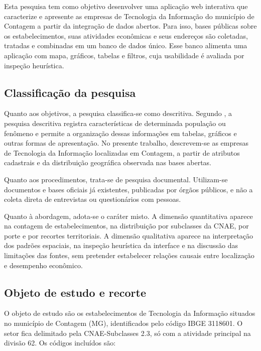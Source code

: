 Esta pesquisa tem como objetivo desenvolver uma aplicação web interativa que caracterize e apresente as empresas de Tecnologia da Informação do município de Contagem a partir da integração de dados abertos.
Para isso, bases públicas sobre os estabelecimentos, suas atividades econômicas e seus endereços são coletadas, tratadas e combinadas em um banco de dados único.
Esse banco alimenta uma aplicação com mapa, gráficos, tabelas e filtros, cuja usabilidade é avaliada por inspeção heurística.

\subsection{Classificação da pesquisa}

Quanto aos objetivos, a pesquisa classifica-se como descritiva.
Segundo , a pesquisa descritiva registra características de determinada população ou fenômeno e permite a organização dessas informações em tabelas, gráficos e outras formas de apresentação.
No presente trabalho, descrevem-se as empresas de Tecnologia da Informação localizadas em Contagem, a partir de atributos cadastrais e da distribuição geográfica observada nas bases abertas.

Quanto aos procedimentos, trata-se de pesquisa documental.
Utilizam-se documentos e bases oficiais já existentes, publicadas por órgãos públicos, e não a coleta direta de entrevistas ou questionários com pessoas.

Quanto à abordagem, adota-se o caráter misto.
A dimensão quantitativa aparece na contagem de estabelecimentos, na distribuição por subclasses da CNAE, por porte e por recortes territoriais.
A dimensão qualitativa aparece na interpretação dos padrões espaciais, na inspeção heurística da interface e na discussão das limitações das fontes, sem pretender estabelecer relações causais entre localização e desempenho econômico.

\subsection{Objeto de estudo e recorte}

O objeto de estudo são os estabelecimentos de Tecnologia da Informação situados no município de Contagem (MG), identificados pelo código IBGE 3118601.
O setor fica delimitado pela CNAE-Subclasses 2.3, só com a atividade principal na divisão 62.
Os códigos incluídos são:

